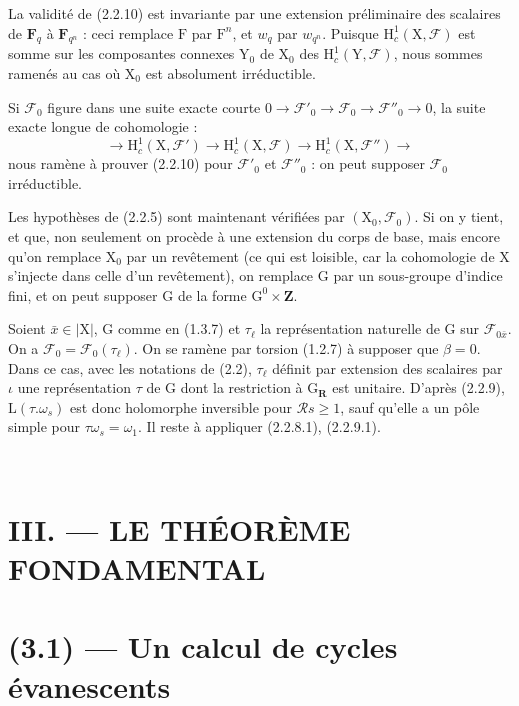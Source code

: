\documentclass[11pt,leqno]{article}
\newcommand{\Page}[1]{\ifvmode\noindent\else\unskip\ \fi{\footnotesize\textcolor{gray}{[p.\,#1]}}\ \ignorespaces}
\begin{document}
La validité de (2.2.10) est invariante par une extension préliminaire des scalaires de \(\mathbf F_q\) à \(\mathbf F_{q^n}\) : ceci remplace \(\mathrm F\) par \(\mathrm F^n\), et \(w_q\) par \(w_{q^n}\). Puisque \(\mathrm H_c^1(\mathrm X,\mathscr F)\) est somme sur les composantes connexes \(\mathrm Y_0\) de \(\mathrm X_0\) des \(\mathrm H_c^1(\mathrm Y,\mathscr F)\), nous sommes ramenés au cas où \(\mathrm X_0\) est absolument irréductible.

Si \(\mathscr F_0\) figure dans une suite exacte courte \(0\to\mathscr F'_0\to\mathscr F_0\to\mathscr F''_0\to0\), la suite exacte longue de cohomologie :
\[
\to\mathrm H_c^1(\mathrm X,\mathscr F')
\to\mathrm H_c^1(\mathrm X,\mathscr F)
\to\mathrm H_c^1(\mathrm X,\mathscr F'')\to
\]
nous ramène à prouver (2.2.10) pour \(\mathscr F'_0\) et \(\mathscr F''_0\) : on peut supposer \(\mathscr F_0\) irréductible.

Les hypothèses de (2.2.5) sont maintenant vérifiées par \((\mathrm X_0,\mathscr F_0)\). Si on y tient, et que, non seulement on procède à une extension du corps de base, mais encore qu’on remplace \(\mathrm X_0\) par un revêtement (ce qui est loisible, car la cohomologie de \(\mathrm X\) s’injecte dans celle d’un revêtement), on remplace \(\mathrm G\) par un sous-groupe d’indice fini, et on peut supposer \(\mathrm G\) de la forme \(\mathrm G^0\times\mathbf Z\).

Soient \(\bar{x}\in|\mathrm X|\), \(\mathrm G\) comme en (1.3.7) et \(\tau_\ell\) la représentation naturelle de \(\mathrm G\) sur \(\mathscr F_{0\bar{x}}\). On a \(\mathscr F_0=\mathscr F_0(\tau_\ell)\). On se ramène par torsion (1.2.7) à supposer que \(\beta=0\). Dans ce cas, avec les notations de (2.2), \(\tau_\ell\) définit par extension des scalaires par \(\iota\) une représentation \(\tau\) de \(\mathrm G\) dont la restriction à \(\mathrm G_{\mathbf R}\) est unitaire. D’après (2.2.9), \(\mathrm L(\tau.\omega_s)\) est donc holomorphe inversible pour \(\mathscr R s\geq1\), sauf qu’elle a un pôle simple pour \(\tau\omega_s=\omega_1\). Il reste à appliquer (2.2.8.1), (2.2.9.1).

\Page{197}

\section*{III. — LE THÉORÈME FONDAMENTAL}

\section*{(3.1) — Un calcul de cycles évanescents}
\end{document}
